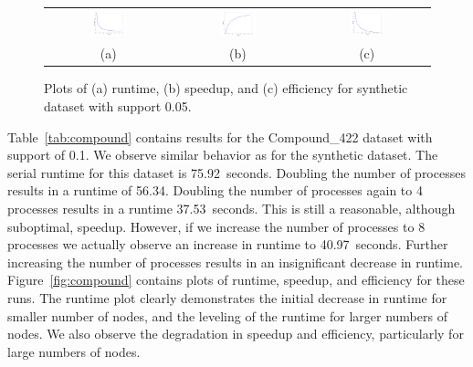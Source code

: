 \begin{figure}
\centering
\begin{tabular}{ccc}
\includegraphics[width=0.3\textwidth]{synth_time.png} &
\includegraphics[width=0.3\textwidth]{synth_speedup.png} &
\includegraphics[width=0.3\textwidth]{synth_efficiency.png} \\
(a) & (b) & (c) \\
\end{tabular}
\caption{Plots of (a) runtime, (b) speedup, and (c) efficiency for
         synthetic dataset with support 0.05.}
\label{fig:synth}
\end{figure}

Table~\ref{tab:compound} contains results for the Compound\_422 dataset with
support of 0.1. We observe similar behavior as for the synthetic dataset. The
serial runtime for this dataset is 75.92~seconds. Doubling the number of
processes results in a runtime of 56.34. Doubling the number of processes again
to 4 processes results in a runtime 37.53~seconds. This is still a reasonable,
although suboptimal, speedup. However, if we increase the number of processes
to 8 processes we actually observe an increase in runtime to 40.97~seconds.
Further increasing the number of processes results in an insignificant decrease
in runtime.
Figure~\ref{fig:compound} contains plots of runtime, speedup, and efficiency
for these runs. The runtime plot clearly demonstrates the initial decrease in
runtime for smaller number of nodes, and the leveling of the runtime for larger
numbers of nodes. We also observe the degradation in speedup and efficiency,
particularly for large numbers of nodes.


